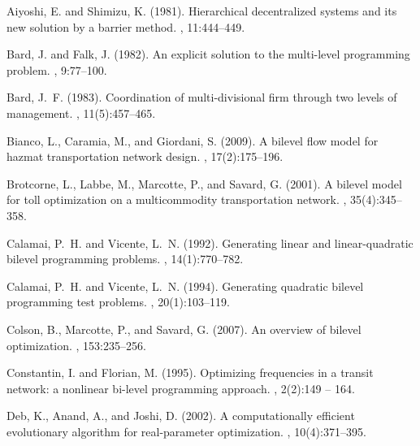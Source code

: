 \documentclass[twoside]{article}
\begin{document}
\begin{thebibliography}{}

Aiyoshi, E. and Shimizu, K. (1981).
\newblock Hierarchical decentralized systems and its new solution by a barrier
  method.
,
  11:444--449.

Bard, J. and Falk, J. (1982).
\newblock An explicit solution to the multi-level programming problem.
, 9:77--100.

Bard, J.~F. (1983).
\newblock Coordination of multi-divisional firm through two levels of
  management.
, 11(5):457--465.

Bianco, L., Caramia, M., and Giordani, S. (2009).
\newblock A bilevel flow model for hazmat transportation network design.
,
  17(2):175--196.

Brotcorne, L., Labbe, M., Marcotte, P., and Savard, G. (2001).
\newblock A bilevel model for toll optimization on a multicommodity
  transportation network.
, 35(4):345--358.

Calamai, P.~H. and Vicente, L.~N. (1992).
\newblock Generating linear and linear-quadratic bilevel programming problems.
, 14(1):770--782.

Calamai, P.~H. and Vicente, L.~N. (1994).
\newblock Generating quadratic bilevel programming test problems.
, 20(1):103--119.

Colson, B., Marcotte, P., and Savard, G. (2007).
\newblock An overview of bilevel optimization.
, 153:235--256.

Constantin, I. and Florian, M. (1995).
\newblock Optimizing frequencies in a transit network: a nonlinear bi-level
  programming approach.
, 2(2):149 --
  164.

Deb, K., Anand, A., and Joshi, D. (2002).
\newblock A computationally efficient evolutionary algorithm for real-parameter
  optimization.
, 10(4):371--395.


\end{thebibliography}
\end{document}
